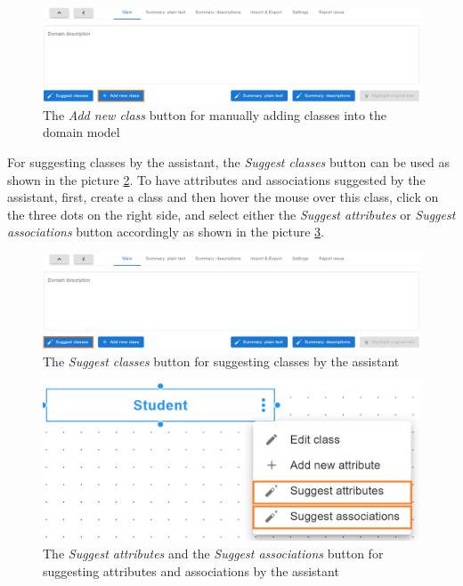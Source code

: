\begin{figure}[!h]
    \includegraphics[scale=0.29]{../docs/images/frontend/add-new-class-manually.png}
    \caption{\centering The \textit{Add new class} button for manually adding classes into the domain model}
    \label{fig:add_new_class}
\end{figure}

For suggesting classes by the assistant, the \textit{Suggest classes} button can be used as shown in the picture \ref{fig:suggest_classes}. To have attributes and associations suggested by the assistant, first, create a class and then hover the mouse over this class, click on the three dots on the right side, and select either the \textit{Suggest attributes} or \textit{Suggest associations} button accordingly as shown in the picture \ref{fig:suggest_attributes}.

\begin{figure}[!h]
    \includegraphics[scale=0.29]{../docs/images/frontend/suggest-classes.png}
    \caption{\centering The \textit{Suggest classes} button for suggesting classes by the assistant}
    \label{fig:suggest_classes}
\end{figure}

\begin{figure}[!h]
    \includegraphics[scale=0.29]{../docs/images/frontend/suggest-attributes.png}
    \caption{\centering The \textit{Suggest attributes} and the \textit{Suggest associations} button for suggesting attributes and associations by the assistant}
    \label{fig:suggest_attributes}
\end{figure}

